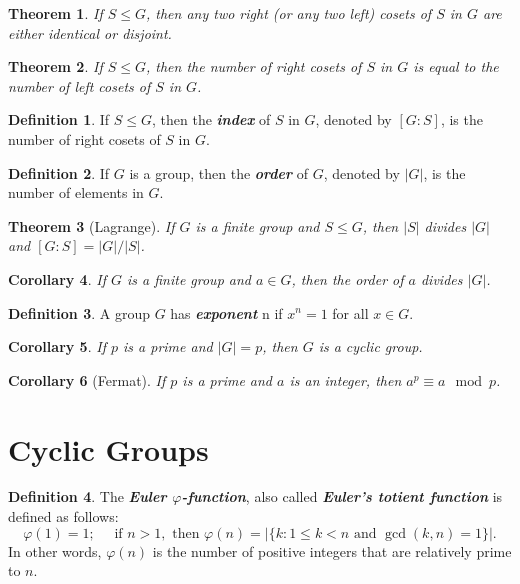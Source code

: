 \documentclass[12pt]{report}
\newtheorem{theorem}{Theorem}[chapter]
\newtheorem{corollary}[theorem]{Corollary}
\theoremstyle{definition}
\newtheorem*{definition}{Definition}
\newcommand{\term}[1]{\textbf{\textit{#1}}}
\begin{document}
\begin{theorem}
	If $S\leq G$, then any two right (or any two left) cosets of $S$ in $G$ are either identical or disjoint.
\end{theorem}

\begin{theorem}
	If $S\leq G$, then the number of right cosets of $S$ in $G$ is equal to the number of left cosets of $S$ in $G$.
\end{theorem}

\begin{definition}
	If $S\leq G$, then the \term{index} of $S$ in $G$, denoted by $[G:S]$, is the number of right cosets of $S$ in $G$.
\end{definition}

\begin{definition}
	If $G$ is a group, then the \term{order} of $G$, denoted by $|G|$, is the number of elements in $G$.
\end{definition}

\begin{theorem}[Lagrange]
	If $G$ is a finite group and $S\leq G$, then $|S|$ divides $|G|$ and $[G:S] = |G|/|S|$.
\end{theorem}

\begin{corollary}
	If $G$ is a finite group and $a\in G$, then the order of $a$ divides $|G|$.
\end{corollary}

\begin{definition}
	A group $G$ has \term{exponent} n if $x^n=1$ for all $x\in G$.
\end{definition}

\begin{corollary}
	If $p$ is a prime and $|G|=p$, then $G$ is a cyclic group.
\end{corollary}

\begin{corollary}[Fermat]
	If $p$ is a prime and $a$ is an integer, then $a^p\equiv a\mod p$.
\end{corollary}


\section{Cyclic Groups}

\begin{definition}
	The \term{Euler $\varphi$-function}, also called \term{Euler's totient function} is defined as follows:
	\[ \varphi(1)=1;\quad\text{ if }n>1,\text{ then }\varphi(n)=|\{k:1\leq k<n\text{ and }\gcd(k, n)=1\}|. \]
	In other words, $\varphi(n)$ is the number of positive integers that are relatively prime to $n$.
\end{definition}
\end{document}
